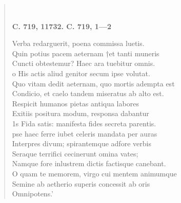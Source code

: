 \documentclass[11pt, a4paper]{report}
\begin{document}
\begin{verse}
        ﻿\pagebreak 
    \begin{center} \textbf{C. 719, 11732. C. 719, 1—2} \end{center} \marginpar{[193]} Verba redarguerit, poena commissa luetis. \\ Quin potius pacem aeternam †et tanti muneris \\ Cuncti obtestemur? Haec ara tuebitur omnis. \\ o His actis aliud genitor secum ipse volutat. \\ Quo vitam dedit aeternam, quo mortis adempta est \\ Condicio, et caelo tandem miseratus ab alto est. \\ Respicit humanos pietas antiqua labores \\ Exitiis positura modum, responsa dabantur \\ 1s Fida satis: manifesta fides secreta parentis. \\ pse haec ferre iubet celeris mandata per auras \\ Interpres divum; spirantemque adfore verbis \\ Seraque terrifici cecinerunt omina vates; \\ Namque fore inlustrem dictis factisque canebant. \\ O quam te memorem, virgo cui mentem animumque \\ Semine ab aetherio superis concessit ab oris \\ Omnipotens.’ \\ 
      \end{verse}
  
\end{document}
